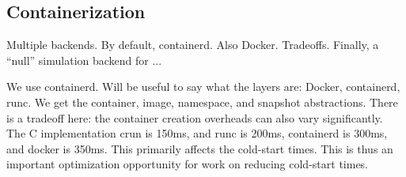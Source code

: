 \subsection{Containerization}

Multiple backends. By default, containerd. Also Docker.
Tradeoffs.
Finally, a ``null'' simulation backend for ...

We use containerd. Will be useful to say what the layers are: Docker, containerd, runc.
We get the container, image, namespace, and snapshot abstractions.
There is a tradeoff here: the container creation overheads can also vary significantly. The C implementation crun is 150ms, and runc is 200ms, containerd is 300ms, and docker is 350ms. This primarily affects the cold-start times. This is thus an important optimization opportunity for work on reducing cold-start times.


